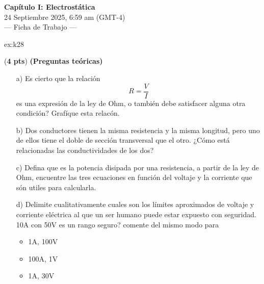  \begin{multicols}{2}
   \begin{center}
         \LARGE{\textbf{Capítulo I: Electrostática}}\\	
         \vspace{0.2cm}
         \large{24 Septiembre 2025, 6:59 am (GMT-4)}\\
         \large{— Ficha de Trabajo —}
     \end{center}
    \begin{excercise}[][][]{ex:k28}{(\textbf{4 pts})
        \textbf{(Preguntas teóricas)}
        \begin{itemize}
            \item[a)] Es cierto que la relación 
                \begin{equation*}
                    R=\frac{V}{I}
                \end{equation*}
                es una expresión de la ley de Ohm, o también debe satisfacer alguna otra condición? Grafíque esta relacón. 
            \item[b)] Dos conductores tienen la misma resistencia y la misma longitud, pero uno de ellos tiene el doble de sección transversal que el otro. ¿Cómo está relacionadas las conductividades de los dos?
            \item[c)] Defina que es la potencia disipada por una resistencia, a partir de la ley de Ohm, encuentre las tres ecuaciones en función del voltaje y la corriente que són utiles para calcularla.
            \item[d)] Delimite cualitativamente cuales son los límites aproximados de voltaje y corriente eléctrica al que un ser humano puede estar expuesto con seguridad. 10A con 50V es un rango seguro? comente del mismo modo para 
                \begin{itemize}
                    \item 1A, 100V
                    \item 100A, 1V
                    \item 1A, 30V

\end{itemize}
\end{itemize}}
\end{excercise}
\end{multicols}
